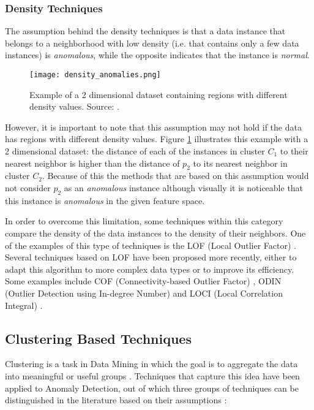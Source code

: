 \subsubsection{Density Techniques}\mbox{}

The assumption behind the density techniques is that a data instance that belongs to a neighborhood with low density (i.e. that contains only a few data instances) is \textit{anomalous}, while the opposite indicates that the instance is \textit{normal}.

\begin{figure}[!ht]
	\centering
	\texttt{[image: density\_anomalies.png]}
	\caption{Example of a 2 dimensional dataset containing regions with different density values. Source: \cite{Kandhari2009}.}
	\label{fig:local_density}
\end{figure}

However, it is important to note that this assumption may not hold if the data has regions with different density values. Figure \ref{fig:local_density} illustrates this example with a 2 dimensional dataset: the distance of each of the instances in cluster $C_1$ to their nearest neighbor is higher than the distance of $p_2$ to its nearest neighbor in cluster $C_2$. Because of this the methods that are based on this assumption would not consider $p_2$ as an \textit{anomalous} instance although visually it is noticeable that this instance is \textit{anomalous} in the given feature space.

In order to overcome this limitation, some techniques within this category compare the density of the data instances to the density of their neighbors. One of the examples of this type of techniques is the LOF (Local Outlier Factor) \cite{Breunig}. Several techniques based on LOF	have been proposed more recently, either to adapt this algorithm to more complex data types or to improve its efficiency. Some examples include COF (Connectivity-based Outlier Factor) \cite{Tang2002}, ODIN (Outlier Detection using In-degree Number) \cite{Hautamaki2004} and LOCI (Local Correlation Integral) \cite{PapadimitriouS.KitagawaH.2003}.

\subsection{Clustering Based Techniques}

Clustering is a task in Data Mining in which the goal is to aggregate the data into meaningful or useful groups \cite{Tan2005}. Techniques that capture this idea have been applied to Anomaly Detection, out of which three groups of techniques can be distinguished in the literature based on their assumptions \cite{Kandhari2009}:

